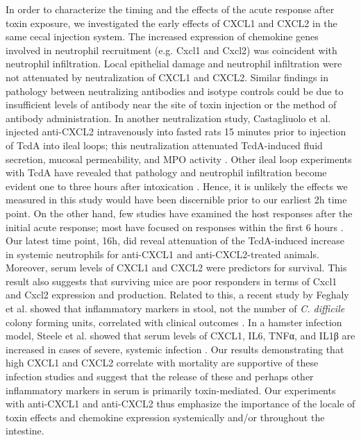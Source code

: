 In order to characterize the timing and the effects of the acute response after toxin exposure, we investigated the early effects of CXCL1 and CXCL2 in the same cecal injection system. The increased expression of chemokine genes involved in neutrophil recruitment (e.g. Cxcl1 and Cxcl2) was coincident with neutrophil infiltration. Local epithelial damage and neutrophil infiltration were not attenuated by neutralization of CXCL1 and CXCL2. Similar findings in pathology between neutralizing antibodies and isotype controls could be due to insufficient levels of antibody near the site of toxin injection or the method of antibody administration. In another neutralization study, Castagliuolo et al. injected anti-CXCL2 intravenously into fasted rats 15 minutes prior to injection of TcdA into ileal loops; this neutralization attenuated TcdA-induced fluid secretion, mucosal permeability, and MPO activity \cite{Castagliuolo:1998um}. Other ileal loop experiments with TcdA have revealed that pathology and neutrophil infiltration become evident one to three hours after intoxication \cite{Ishida:2004ta,Castagliuolo:1998um}. Hence, it is unlikely the effects we measured in this study would have been discernible prior to our earliest 2h time point. On the other hand, few studies have examined the host responses after the initial acute response; most have focused on responses within the first 6 hours \cite{Morteau:2002ts,Kelly:1994cu,Kokkotou:2009ik,Ishida:2004ta,Alcantara:2005dt,Warny:2000ct,Castagliuolo:1994ta}. Our latest time point, 16h, did reveal attenuation of the TcdA-induced increase in systemic neutrophils for anti-CXCL1 and anti-CXCL2-treated animals. Moreover, serum levels of CXCL1 and CXCL2 were predictors for survival. This result also suggests that surviving mice are poor responders in terms of Cxcl1 and Cxcl2 expression and production. Related to this, a recent study by Feghaly et al. showed that inflammatory markers in stool, not the number of \textit{C. difficile} colony forming units, correlated with clinical outcomes \cite{ElFeghaly:2013gq}. In a hamster infection model, Steele et al. showed that serum levels of CXCL1, IL6, TNFα, and IL1β are increased in cases of severe, systemic infection \cite{Steele:2012ft}. Our results demonstrating that high CXCL1 and CXCL2 correlate with mortality are supportive of these infection studies and suggest that the release of these and perhaps other inflammatory markers in serum is primarily toxin-mediated. Our experiments with anti-CXCL1 and anti-CXCL2 thus emphasize the importance of the locale of toxin effects and chemokine expression systemically and/or throughout the intestine.

